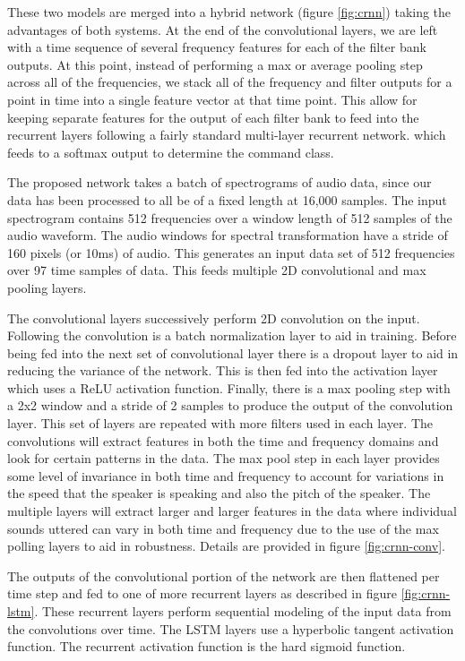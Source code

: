 \documentclass{article}
\begin{document}
These two models are merged into a hybrid network (figure
\ref{fig:crnn}) taking the
advantages of both systems. At the end of the convolutional layers, we
are left with a time sequence of several frequency features for each
of the filter bank outputs. At this point, instead of performing a max
or average pooling step across all of the frequencies, we stack all of
the frequency and filter outputs for a point in time into a single
feature vector at that time point. This allow for keeping separate
features for the output of each filter bank to feed into the recurrent
layers following a fairly standard multi-layer recurrent
network. which feeds to a softmax output to determine the command
class.

The proposed network takes a batch of spectrograms of audio data, since
our data has been processed to all be of a fixed length at 16,000
samples. The input spectrogram contains 512 frequencies over a window
length of 512 samples of the audio waveform. The audio windows for spectral
transformation have a stride of 160 pixels (or 10ms) of audio. This
generates an input data set of 512 frequencies over 97 time samples of
data. This feeds multiple 2D convolutional and max pooling layers.

The convolutional layers successively perform 2D convolution on the
input. Following the convolution is a batch normalization layer to aid
in training. Before being fed into the next set of convolutional layer
there is a dropout layer to aid in reducing the variance of the
network. This is then fed into the activation layer which uses a
ReLU activation function. Finally, there is a max pooling step with a
2x2 window and a stride of 2 samples to produce the output of the
convolution layer. This set of layers are repeated with more filters
used in each layer. The convolutions will extract features in both the
time and frequency domains and look for certain patterns in the
data. The max pool step in each layer provides some level of
invariance in both time and frequency to account for variations in the
speed that the speaker is speaking and also the pitch of the
speaker. The multiple layers will extract larger and larger features
in the data where individual sounds uttered can vary in both time and
frequency due to the use of the max polling layers to aid in
robustness. Details are provided in figure \ref{fig:crnn-conv}.

The outputs of the convolutional portion of the network are then
flattened per time step and fed to one of more recurrent layers as
described in figure \ref{fig:crnn-lstm}. These
recurrent layers perform sequential modeling of the input data from
the convolutions over time. The LSTM layers use a hyperbolic tangent
activation function. The recurrent activation function is the hard
sigmoid function.
\end{document}
